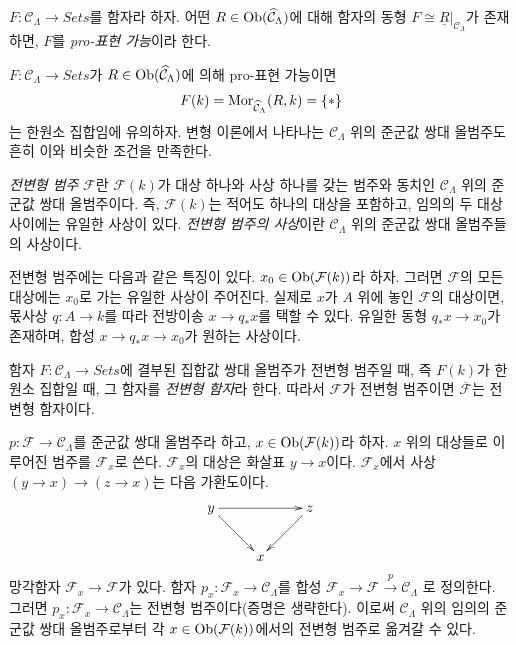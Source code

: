 \begin{definition}
\label{definition-prorepresentable}
$F : \mathcal{C}_\Lambda \to \textit{Sets}$를 함자라 하자.
어떤 $R \in \mathop{\mathrm{Ob}}\nolimits(\widehat{\mathcal{C}}_\Lambda)$에 대해 함자의 동형
$F \cong \underline{R}|_{\mathcal{C}_\Lambda}$가 존재하면,
$F$를 {\it pro-표현 가능}이라 한다.
\end{definition}

\noindent
$F : \mathcal{C}_\Lambda \to \textit{Sets}$가
$R \in \mathop{\mathrm{Ob}}\nolimits(\widehat{\mathcal{C}}_\Lambda)$에 의해 pro-표현 가능이면
$$
F(k) = \mathop{\mathrm{Mor}}\nolimits_{\widehat{\mathcal{C}}_\Lambda}(R, k) = \{*\}
$$
는 한원소 집합임에 유의하자. 변형 이론에서 나타나는
$\mathcal{C}_\Lambda$ 위의 준군값 쌍대 올범주도 흔히 이와 비슷한
조건을 만족한다.%

\begin{definition}
\label{definition-predeformation-category}
{\it 전변형 범주} $\mathcal{F}$란 $\mathcal{F}(k)$가 대상 하나와
사상 하나를 갖는 범주와 동치인 $\mathcal{C}_\Lambda$ 위의
준군값 쌍대 올범주이다. 즉, $\mathcal{F}(k)$는 적어도 하나의
대상을 포함하고, 임의의 두 대상 사이에는 유일한 사상이 있다.
{\it 전변형 범주의 사상}이란 $\mathcal{C}_\Lambda$ 위의
준군값 쌍대 올범주들의 사상이다.
\end{definition}

\noindent
전변형 범주에는 다음과 같은 특징이 있다.
$x_0 \in \mathop{\mathrm{Ob}}\nolimits(\mathcal{F}(k))$라 하자. 그러면 $\mathcal{F}$의
모든 대상에는 $x_0$로 가는 유일한 사상이 주어진다. 실제로
$x$가 $A$ 위에 놓인 $\mathcal{F}$의 대상이면, 몫사상
$q : A \to k$를 따라 전방이송 $x \to q_*x$를 택할 수 있다.
유일한 동형 $q_*x \to x_0$가 존재하며, 합성
$x \to q_*x \to x_0$가 원하는 사상이다.

\begin{remark}
\label{remark-predeformation-functor}
함자 $F: \mathcal{C}_\Lambda \to \textit{Sets}$에 결부된 집합값
쌍대 올범주가 전변형 범주일 때, 즉 $F(k)$가 한원소 집합일 때,
그 함자를 {\it 전변형 함자}라 한다. 따라서 $\mathcal{F}$가
전변형 범주이면 $\overline{\mathcal{F}}$는 전변형 함자이다.
\end{remark}

\begin{remark}
\label{remark-localize-cofibered-groupoid}
$p : \mathcal{F} \to \mathcal{C}_\Lambda$를 준군값 쌍대
올범주라 하고, $x \in \mathop{\mathrm{Ob}}\nolimits(\mathcal{F}(k))$라 하자.
$x$ 위의 대상들로 이루어진 범주를 $\mathcal{F}_x$로 쓴다.
$\mathcal{F}_x$의 대상은 화살표 $y \to x$이다.
$\mathcal{F}_x$에서 사상 $(y \to x) \to (z \to x)$는 다음
가환도이다.
$$
\xymatrix{
y \ar[rr] \ar[dr] & & z \ar[dl] \\
& x &
}
$$
망각함자 $\mathcal{F}_x \to \mathcal{F}$가 있다. 함자
$p_x : \mathcal{F}_x \to \mathcal{C}_\Lambda$를 합성
$\mathcal{F}_x \to \mathcal{F} \xrightarrow{p} \mathcal{C}_\Lambda$
로 정의한다. 그러면 $p_x : \mathcal{F}_x \to \mathcal{C}_\Lambda$는
전변형 범주이다(증명은 생략한다). 이로써
$\mathcal{C}_\Lambda$ 위의 임의의 준군값 쌍대 올범주로부터
각 $x \in \mathop{\mathrm{Ob}}\nolimits(\mathcal{F}(k))$에서의 전변형 범주로 옮겨갈 수 있다.
\end{remark}

